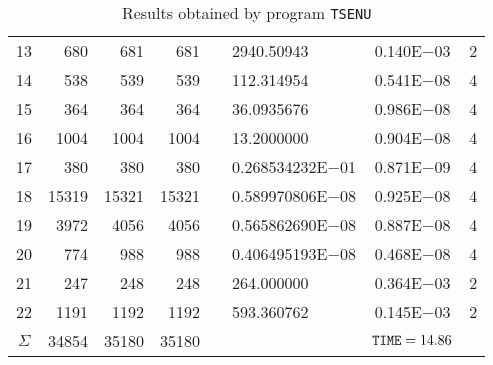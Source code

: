 \documentclass{esub2acm}
\begin{document}
\begin{table}
\begin{tabular}{c|rrrr@{}lcc}
13  &   680 &   681 &   681 &       &   2940.50943  &   0.140E$-$03 &   2   \\
14  &   538 &   539 &   539 &       &   112.314954  &   0.541E$-$08 &   4   \\
15  &   364 &   364 &   364 &       &   36.0935676  &   0.986E$-$08 &   4   \\
16  &   1004    &   1004    &   1004    &       &   13.2000000  &   0.904E$-$08 &   4   \\
17  &   380 &   380 &   380 &       &   0.268534232E$-$01   &   0.871E$-$09 &   4   \\
18  &   15319   &   15321   &   15321   &       &   0.589970806E$-$08   &   0.925E$-$08 &   4   \\
19  &   3972    &   4056    &   4056    &       &   0.565862690E$-$08   &   0.887E$-$08 &   4   \\
20  &   774 &   988 &   988 &       &   0.406495193E$-$08   &   0.468E$-$08 &   4   \\
21  &   247 &   248 &   248 &       &   264.000000  &   0.364E$-$03 &   2   \\
22  &   1191    &   1192    &   1192    &       &   593.360762  &   0.145E$-$03 &   2   \\ \hline
$\Sigma$\rule[-2pt]{0pt}{12pt}  &   34854   &   35180   &   35180   &       &       &   ${\tt TIME} = 14.86$    &       \\ \hline
\end{tabular}
\caption{Results obtained by program {\tt TSENU}}
\label{tsenu}
\end{table}

\clearpage
\end{document}

